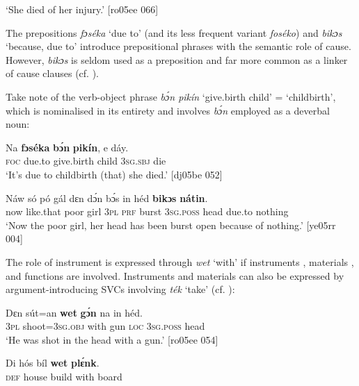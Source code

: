 \glt ‘She died of her injury.’ [ro05ee 066]
\z

The prepositions \textit{fɔséka} ‘due to’ (and its less frequent variant \textit{foséko})  and \textit{bikɔs} ‘because, due to’  introduce prepositional phrases with the semantic role of cause. However, \textit{bikɔs} is seldom used as a preposition and far more common as a linker of cause clauses (cf. ). 


Take note of the verb-object phrase \textit{bɔ́n pikín} ‘give.birth child’ = ‘childbirth’, which is nominalised in its entirety and involves \textit{bɔ́n} employed as a deverbal noun: 



\ea%
    \label{ex:key:1063}
    \gll Na  \textbf{fɔséka}  \textbf{bɔ́n}     \textbf{pikín},  e    dáy.\\
\textsc{foc}  due.to  give.birth  child  \textsc{3sg.sbj}  die\\

\glt ‘It’s due to childbirth (that) she died.’ [dj05be 052]
\z


\ea%
    \label{ex:key:1064}
    \gll Náw  só    pó    gál  dɛn  dɔ́n  bɔ́s    in    héd
\textbf{bikɔs}  \textbf{nátin}.\\
now  like.that  poor  girl  \textsc{3pl}  \textsc{prf}  burst  \textsc{3sg.poss}  head
due.to  nothing\\

\glt ‘Now the poor girl, her head has been burst open 
because of nothing.’ [ye05rr 004]
\z

The role of instrument is expressed through \textit{wet} ‘with’ if instruments , materials , and functions  are involved. Instruments and materials can also be expressed by argument-introducing SVCs involving \textit{ték} ‘take’ (cf. ):


\ea%
    \label{ex:key:1065}
    \gll Dɛn  sút=an    \textbf{wet}    \textbf{gɔ́n}  na  in    héd.\\
\textsc{3pl}  shoot=\textsc{3sg.obj}  with    gun  \textsc{loc}  \textsc{3sg.poss}  head\\

\glt ‘He was shot in the head with a gun.’ [ro05ee 054]
\z


\ea%
    \label{ex:key:1066}
    \gll Di  hós    bíl    \textbf{wet}    \textbf{plɛ́nk}.\\
\textsc{def}  house  build  with    board\\

